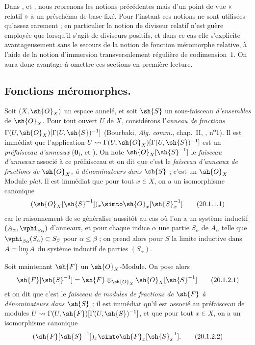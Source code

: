 Dans ,  et , nous reprenons les notions précédentes mais d'un point de vue « relatif » à un préschéma de base fixé.
Pour l'instant ces notions ne sont utilisées qu'assez rarement ; en particulier la notion de diviseur relatif n'est guère employée que lorsqu'il s'agit de diviseurs positifs, et dans ce cas elle s'explicite avantageusement sans le secours de la notion de fonction méromorphe relative, à l'aide de la notion d'immersion transversalement régulière de codimension~$1$.
On aura donc avantage à omettre ces sections en première lecture.

\subsection{Fonctions méromorphes.}

\begin{env}[20.1.1]
Soit $(X,\sh{O}_X)$ un espace annelé, et soit $\sh{S}$ un sous-faisceau \emph{d'ensembles} de $\sh{O}_X$.
Pour tout ouvert $U$ de $X$, considérons l'\emph{anneau de fractions} $\Gamma(U,\sh{O}_X)[\Gamma(U,\sh{S})^{-1}]$ (Bourbaki, \emph{Alg. comm.}, chap.~II, , n\textsuperscript{o}1).
Il est immédiat que l'application $U\leadsto\Gamma(U,\sh{O}_X)[\Gamma(U,\sh{S})^{-1}]$ est un \emph{préfaisceau d'anneaux} ($\mathbf{0}_{\mathrm I}$,  et ).
On note $\sh{O}_X[\sh{S}^{-1}]$ le \emph{faisceau d'anneaux} associé à ce préfaisceau et on dit que c'est le \emph{faisceau d'anneaux de fractions de $\sh{O}_X$, à dénominateurs dans $\sh{S}$} ; c'est un $\sh{O}_X$-Module \emph{plat}.
Il est immédiat que pour tout $x\in X$, on a un isomorphisme canonique
\[
\label{IV.20.1.1.1}
  (\sh{O}_X[\sh{S}^{-1}])_x\simto\sh{O}_x[\sh{S}_x^{-1}]
  \tag{20.1.1.1}
\]
car le raisonnement de  se généralise aussitôt au cas où l'on a un système inductif $(A_\alpha,\vphi_{\beta\alpha})$ d'anneaux, et pour chaque indice $\alpha$ une partie $S_\alpha$ de $A_\alpha$ telle que
$\vphi_{\beta\alpha}(S_\alpha)\subset S_\beta$ pour $\alpha\leq\beta$ ; on prend alors pour $S$ la limite inductive dans $A=\varinjlim A$ du système inductif de parties $(S_\alpha)$.
\end{env}

\begin{env}[20.1.2]
Soit maintenant $\sh{F}$ un $\sh{O}_X$-Module.
On pose alors
\[
\label{IV.20.1.2.1}
  \sh{F}[\sh{S}^{-1}]=\sh{F}\otimes_{\sh{O}_X}\sh{O}_X[\sh{S}^{-1}]
  \tag{20.1.2.1}
\]
et on dit que c'est le \emph{faisceau de modules de fractions de $\sh{F}$ à dénominateurs dans $\sh{S}$} ; il est immédiat qu'il est associé au préfaisceau de modules $U\leadsto\Gamma(U,\sh{F})[\Gamma(U,\sh{S})^{-1}]$, et que pour tout $x\in X$, on a un isomorphisme canonique
\[
\label{IV.20.1.2.2}
  (\sh{F}[\sh{S}^{-1}])_x\simto\sh{F}_x[\sh{S}_x^{-1}].
  \tag{20.1.2.2}
\]
\end{env}

